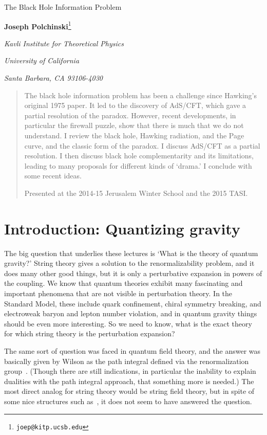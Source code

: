 \documentclass[12pt]{article}
\newcommand{\sect}[1]{\section{#1}\setcounter{equation}{0}}
\begin{document}

\begin{titlepage}
\bigskip
\bigskip\bigskip\bigskip
\centerline{\Large The Black Hole Information Problem}
\bigskip\bigskip\bigskip
\bigskip\bigskip\bigskip

 \centerline{ {\bf Joseph Polchinski}\footnote{\tt joep@kitp.ucsb.edu}}
\medskip
\centerline{\em Kavli Institute for Theoretical Physics}
\centerline{\em University of California}
\centerline{\em Santa Barbara, CA 93106-4030}\bigskip
\bigskip
\bigskip\bigskip



\begin{abstract}
The black hole information problem has been a challenge since Hawking's original 1975 paper.  It led to the discovery of AdS/CFT, which gave a partial resolution of the paradox.  However, recent developments, in particular the firewall puzzle, show that there is much that we do not understand.  I review the black hole, Hawking radiation, and the Page curve, and the classic form of the paradox.  I discuss AdS/CFT as a partial resolution.  I then discuss black hole complementarity and its limitations, leading to many proposals for different kinds of `drama.'  I conclude with some recent ideas.

Presented at the 2014-15 Jerusalem Winter School and the 2015 TASI.
\end{abstract}
\end{titlepage}
\setcounter{footnote}{0}

\tableofcontents

\sect{Introduction: Quantizing gravity}

The big question that underlies these lectures is `What is the theory of quantum gravity?'  String theory gives a solution to the renormalizability problem, and it does many other good things, but it is only a perturbative expansion in powers of the coupling.  We know that quantum theories exhibit many fascinating and important phenomena that are not visible in perturbation theory.  In the Standard Model, these include quark confinement, chiral symmetry breaking, and electroweak baryon and lepton number violation, and in quantum gravity things should be even more interesting.  So we need to know, what is the exact theory for which string theory is the perturbation expansion? 

The same sort of question was faced in quantum field theory, and the answer was basically given by Wilson as the path integral defined via the renormalization group~\cite{Wilson:1993dy}.   (Though there are still indications, in particular the inability to explain dualities with the path integral approach, that something more is needed.)  The most direct analog for string theory would be string field theory, but in spite of some nice structures such as~\cite{Witten:1985cc}, it does not seem to have answered the question.
\end{document}
